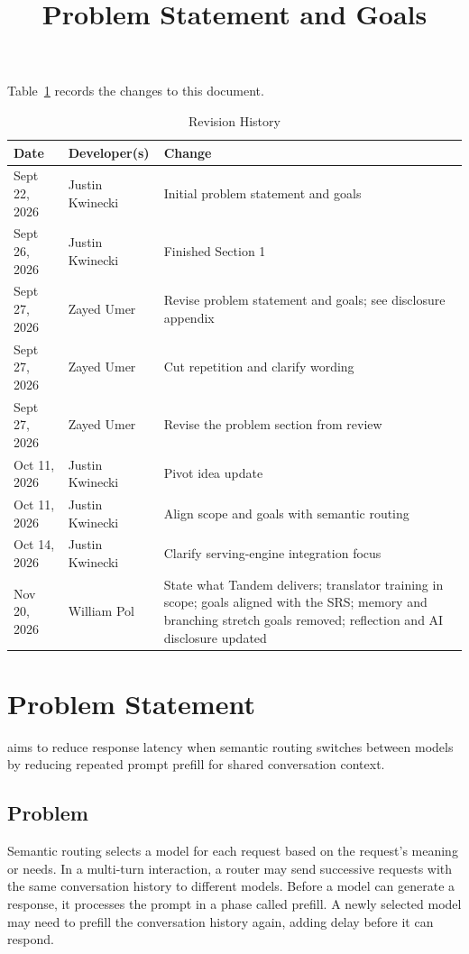 \documentclass[11pt]{article}
\title{Problem Statement and Goals\\\progname}
\author{\authname}
\date{}
\begin{document}
\maketitle

Table~\ref{TblRevisionHistory} records the changes to this document.

\begin{table}[H]
\caption{Revision History} \label{TblRevisionHistory}
\begin{tabularx}{\textwidth}{llX}
\toprule
\textbf{Date} & \textbf{Developer(s)} & \textbf{Change}\\
\midrule
Sept 22, 2026 & Justin Kwinecki & Initial problem statement and goals\\
Sept 26, 2026 & Justin Kwinecki & Finished Section 1\\
Sept 27, 2026 & Zayed Umer & Revise problem statement and goals;
see disclosure appendix\\
Sept 27, 2026 & Zayed Umer & Cut repetition and clarify wording\\
Sept 27, 2026 & Zayed Umer & Revise the problem section from review\\
Oct 11, 2026 & Justin Kwinecki & Pivot idea update \\
Oct 11, 2026 & Justin Kwinecki & Align scope and goals with semantic routing \\
Oct 14, 2026 & Justin Kwinecki & Clarify serving-engine integration focus \\
Nov 20, 2026 & William Pol & State what Tandem delivers; translator training in
scope; goals aligned with the SRS; memory and branching stretch goals
removed; reflection and AI disclosure updated \\
\bottomrule
\end{tabularx}
\end{table}

\section{Problem Statement}

\progname{} aims to reduce response latency when semantic routing switches
between models by reducing repeated prompt prefill for shared conversation
context.

\subsection{Problem}

Semantic routing selects a model for each request based on the request's
meaning or needs. In a multi-turn interaction, a router may send successive
requests with the same conversation history to different models. Before a
model can generate a response, it processes the prompt in a phase called
prefill. A newly selected model may need to prefill the conversation history
again, adding delay before it can respond.
\end{document}
